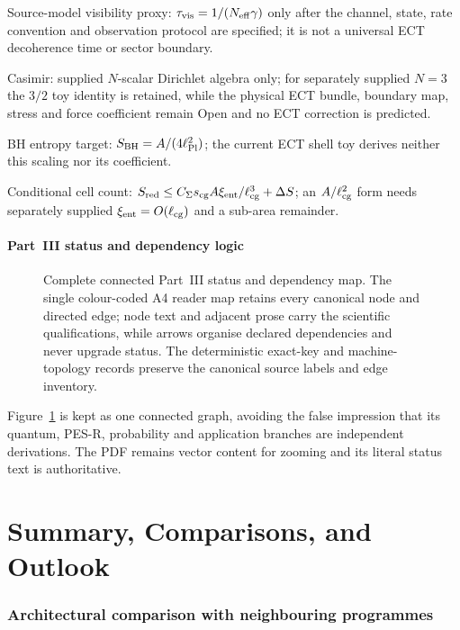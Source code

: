 \documentclass[11pt,a4paper]{article}
\begin{document}
Source-model visibility proxy: $\tau_{\rm vis}=1/(N_{\rm eff}\gamma)$ only
after the channel, state, rate convention and observation protocol are
specified; it is not a universal ECT decoherence time or sector boundary.

Casimir: supplied $N$-scalar Dirichlet algebra only; for separately supplied $N=3$ the $3/2$ toy identity is retained, while the physical ECT bundle, boundary map, stress and force coefficient remain Open and no ECT correction is predicted.

BH entropy target: $S_{\rm BH}=A/(4\ell_{\rm Pl}^2)$; the current ECT shell toy derives neither this scaling nor its coefficient.

Conditional cell count:
$S_{\rm red}\le C_\Sigma s_{\rm cg}A\xi_{\rm ent}/\ell_{\rm cg}^3+\Delta S$;
an $A/\ell_{\rm cg}^2$ form needs separately supplied
$\xi_{\rm ent}=O(\ell_{\rm cg})$ and a sub-area remainder.

\subsection{Part~III status and dependency logic}

\begin{figure}[H]
\caption{Complete connected Part~III status and dependency map.  The single
colour-coded A4 reader map retains every canonical node and directed edge; node
text and adjacent prose carry the scientific qualifications, while arrows
organise declared dependencies and never upgrade status.  The deterministic
exact-key and machine-topology records preserve the canonical source labels
and edge inventory.}
\label{fig:pop_partIII_logic}
\end{figure}

Figure~\ref{fig:pop_partIII_logic} is kept as one connected graph, avoiding
the false impression that its quantum, PES-R, probability and application
branches are independent derivations.  The PDF remains vector content for
zooming and its literal status text is authoritative.

\clearpage

\clearpage

\part{Summary, Comparisons, and Outlook}
\label{part:summary_pop}


\section{Architectural comparison with neighbouring programmes}
\end{document}
